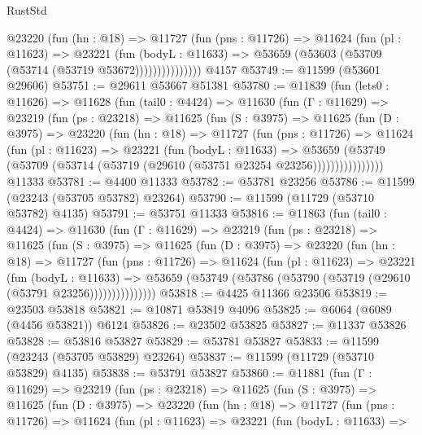 \begin{lexlean}{RustStd}
\begin{coremodule}
                @23220
                  (fun (hn : @18) =>
                  @11727
                    (fun (pns : @11726) =>
                    @11624
                      (fun (pl : @11623) =>
                      @23221
                        (fun (bodyL : @11633) =>
                        @53659 (@53603 (@53709 (@53714 (@53719 @53672)))))))))))))))
    @4157
@53749 := @11599 (@53601 @29606)
@53751 := @29611 @53667 @51381
@53780 := @11839
    (fun (lets0 : @11626) =>
    @11628
      (fun (tail0 : @4424) =>
      @11630
        (fun (Γ : @11629) =>
        @23219
          (fun (ps : @23218) =>
          @11625
            (fun (S : @3975) =>
            @11625
              (fun (D : @3975) =>
              @23220
                (fun (hn : @18) =>
                @11727
                  (fun (pns : @11726) =>
                  @11624
                    (fun (pl : @11623) =>
                    @23221
                      (fun (bodyL : @11633) =>
                      @53659
                        (@53749
                          (@53709 (@53714 (@53719 (@29610 (@53751 @23254 @23256))))))))))))))))
    @11333
@53781 := @4400 @11333
@53782 := @53781 @23256
@53786 := @11599 (@23243 (@53705 @53782) @23264)
@53790 := @11599 (@11729 (@53710 @53782) @4135)
@53791 := @53751 @11333
@53816 := @11863
    (fun (tail0 : @4424) =>
    @11630
      (fun (Γ : @11629) =>
      @23219
        (fun (ps : @23218) =>
        @11625
          (fun (S : @3975) =>
          @11625
            (fun (D : @3975) =>
            @23220
              (fun (hn : @18) =>
              @11727
                (fun (pns : @11726) =>
                @11624
                  (fun (pl : @11623) =>
                  @23221
                    (fun (bodyL : @11633) =>
                    @53659 (@53749 (@53786 (@53790 (@53719 (@29610 (@53791 @23256)))))))))))))))
@53818 := @4425 @11366 @23506
@53819 := @23503 @53818
@53821 := @10871 @53819 @4096
@53825 := @6064 (@6089 (@4456 @53821)) @6124
@53826 := @23502 @53825
@53827 := @11337 @53826
@53828 := @53816 @53827
@53829 := @53781 @53827
@53833 := @11599 (@23243 (@53705 @53829) @23264)
@53837 := @11599 (@11729 (@53710 @53829) @4135)
@53838 := @53791 @53827
@53860 := @11881
    (fun (Γ : @11629) =>
    @23219
      (fun (ps : @23218) =>
      @11625
        (fun (S : @3975) =>
        @11625
          (fun (D : @3975) =>
          @23220
            (fun (hn : @18) =>
            @11727
              (fun (pns : @11726) =>
              @11624
                (fun (pl : @11623) =>
                @23221
                  (fun (bodyL : @11633) =>

\end{coremodule}
\end{lexlean}
